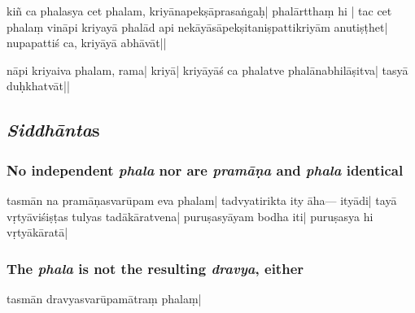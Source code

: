 kiñ ca phala\mds sya \mde cet phalam, kriyānapekṣāprasaṅgaḥ| phalārtthaṃ hi 
%
| tac ce\mds t pha\mde laṃ vināpi kriyayā phalād api 
%
nekāy\mds āsā\-pekṣitaniṣpattikriyām anutiṣṭhet| nupapattiś ca, kri\mds yāyā abhā\-vā\mde t||

nāpi kriyaiva phalam, rama| 
 \mds kriyā| kri\-yāyāś ca
phalatve phalā\mde nabhilāṣitva| 
\mds tasyā duḥkhatvāt||

\subsection{\emph{Siddhānta}s}
\subsubsection{No independent \emph{phala} nor are \emph{pramāṇa} and \emph{phala}  identical}
tasmān na pramāṇasvarūpam eva phalam|  tadvya\mde ti\mds rikta ity āha--- ityādi|  tayā  vṛ\mds tyā\-viśi\-ṣṭa\-s tulyas tadākāratvena| 
 puruṣasyāyam \mds bodha iti| puruṣasya hi vṛtyākāratā| 

\subsubsection{The \emph{phala} is not the resulting \emph{dravya}, either}
tasmān  dravyasvarūpamātraṃ phalaṃ| 

